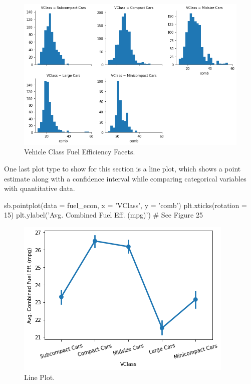\begin{figure}
	\includegraphics[width=\textwidth,height=\textheight,keepaspectratio]{images/figure24.png}
	\caption{Vehicle Class Fuel Efficiency Facets.}\label{fig:figure24}
\end{figure}

\newpage
One last plot type to show for this section is a line plot, which shows a point estimate along with a confidence interval while comparing categorical variables with quantitative data.

\begin{python}
	sb.pointplot(data = fuel_econ, x = 'VClass', y = 'comb')
	plt.xticks(rotation = 15)
	plt.ylabel('Avg. Combined Fuel Eff. (mpg)')
	# See Figure 25
\end{python}

\begin{figure}
	\includegraphics{images/figure25.png}
	\caption{Line Plot.}\label{fig:figure25}
\end{figure}

